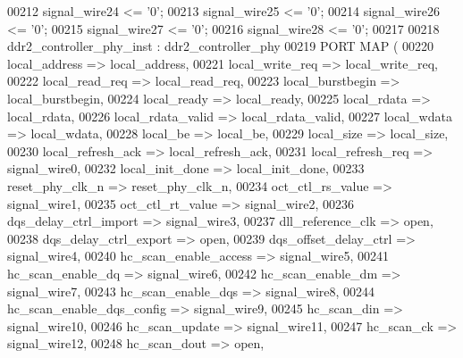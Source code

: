 \begin{DoxyCode}
{00212     \textcolor{keywordflow}{signal}\textcolor{vhdlchar}{\_wire24}  \textcolor{vhdlchar}{<=}  \textcolor{vhdlchar}{'}\textcolor{vhdllogic}{}\textcolor{vhdllogic}{0}\textcolor{vhdlchar}{'};
00213     \textcolor{keywordflow}{signal}\textcolor{vhdlchar}{\_wire25}  \textcolor{vhdlchar}{<=}  \textcolor{vhdlchar}{'}\textcolor{vhdllogic}{}\textcolor{vhdllogic}{0}\textcolor{vhdlchar}{'};
00214     \textcolor{keywordflow}{signal}\textcolor{vhdlchar}{\_wire26}  \textcolor{vhdlchar}{<=}  \textcolor{vhdlchar}{'}\textcolor{vhdllogic}{}\textcolor{vhdllogic}{0}\textcolor{vhdlchar}{'};
00215     \textcolor{keywordflow}{signal}\textcolor{vhdlchar}{\_wire27}  \textcolor{vhdlchar}{<=}  \textcolor{vhdlchar}{'}\textcolor{vhdllogic}{}\textcolor{vhdllogic}{0}\textcolor{vhdlchar}{'};
00216     \textcolor{keywordflow}{signal}\textcolor{vhdlchar}{\_wire28}  \textcolor{vhdlchar}{<=}  \textcolor{vhdlchar}{'}\textcolor{vhdllogic}{}\textcolor{vhdllogic}{0}\textcolor{vhdlchar}{'};
00217 
00218     ddr2_controller_phy_inst : ddr2_controller_phy
00219     \textcolor{keywordflow}{PORT} \textcolor{keywordflow}{MAP} (
00220         local_address  =>  local_address,
00221         local_write_req  =>  local_write_req,
00222         local_read_req  =>  local_read_req,
00223         local_burstbegin  =>  local_burstbegin,
00224         local_ready  =>  local_ready,
00225         local_rdata  =>  local_rdata,
00226         local_rdata_valid  =>  local_rdata_valid,
00227         local_wdata  =>  local_wdata,
00228         local_be  =>  local_be,
00229         local_size  =>  local_size,
00230         local_refresh_ack  =>  local_refresh_ack,
00231         local_refresh_req  =>  signal_wire0,
00232         local_init_done  =>  local_init_done,
00233         reset_phy_clk_n  =>  reset_phy_clk_n,
00234         oct_ctl_rs_value  =>  signal_wire1,
00235         oct_ctl_rt_value  =>  signal_wire2,
00236         dqs_delay_ctrl_import  =>  signal_wire3,
00237         dll_reference_clk  =>  \textcolor{keywordflow}{open},
00238         dqs_delay_ctrl_export  =>  \textcolor{keywordflow}{open},
00239         dqs_offset_delay_ctrl  =>  signal_wire4,
00240         hc_scan_enable_access  =>  signal_wire5,
00241         hc_scan_enable_dq  =>  signal_wire6,
00242         hc_scan_enable_dm  =>  signal_wire7,
00243         hc_scan_enable_dqs  =>  signal_wire8,
00244         hc_scan_enable_dqs_config  =>  signal_wire9,
00245         hc_scan_din  =>  signal_wire10,
00246         hc_scan_update  =>  signal_wire11,
00247         hc_scan_ck  =>  signal_wire12,
00248         hc_scan_dout  =>  \textcolor{keywordflow}{open},
}
\end{DoxyCode}
